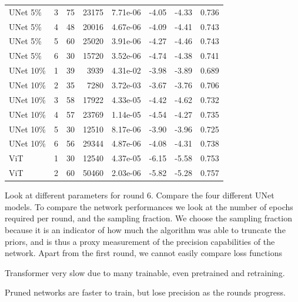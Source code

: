 \begin{table}
\begin{tabular}{lrrrrrrr}
UNet 5\% & 3 & 75 & 23175 & 7.71e-06 & -4.05 & -4.33 & 0.736 \\
UNet 5\% & 4 & 48 & 20016 & 4.67e-06 & -4.09 & -4.41 & 0.743 \\
UNet 5\% & 5 & 60 & 25020 & 3.91e-06 & -4.27 & -4.46 & 0.743 \\
UNet 5\% & 6 & 30 & 15720 & 3.52e-06 & -4.74 & -4.38 & 0.741 \\
\midrule
UNet 10\% & 1 & 39 & 3939 & 4.31e-02 & -3.98 & -3.89 & 0.689 \\
UNet 10\% & 2 & 35 & 7280 & 3.72e-03 & -3.67 & -3.76 & 0.706 \\
UNet 10\% & 3 & 58 & 17922 & 4.33e-05 & -4.42 & -4.62 & 0.732 \\
UNet 10\% & 4 & 57 & 23769 & 1.14e-05 & -4.54 & -4.27 & 0.735 \\
UNet 10\% & 5 & 30 & 12510 & 8.17e-06 & -3.90 & -3.96 & 0.725 \\
UNet 10\% & 6 & 56 & 29344 & 4.87e-06 & -4.08 & -4.31 & 0.738 \\
\midrule
ViT & 1 & 30 & 12540 & 4.37e-05 & -6.15 & -5.58 & 0.753 \\
ViT & 2 & 60 & 50460 & 2.03e-06 & -5.82 & -5.28 & 0.757 \\
\bottomrule
\end{tabular}
\end{table}


Look at different parameters for round 6.
Compare the four different UNet models.
To compare the network performances we look at the number of epochs required per round, and the sampling fraction. We choose the sampling fraction because it is an indicator of how much the algorithm was able to truncate the priors, and is thus a proxy measurement of the precision capabilities of the network. Apart from the first round, we cannot easily compare loss functions 

Transformer very slow due to many trainable, even pretrained and retraining.

Pruned networks are faster to train, but lose precision as the rounds progress.

